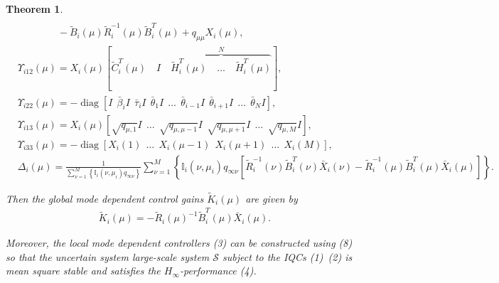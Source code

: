 \documentclass[11pt,draftcls,onecolumn]{IEEEtran}
\DeclareMathOperator{\diag}{diag}
\newtheorem{theorem}{Theorem}
\begin{document}
\begin{theorem}
\begin{align*}
\\&\quad \quad \quad \quad -\tilde{B}_i(\mu)\tilde{R}_i^{-1}(\mu)\tilde{B}_i^T(\mu)+q_{\mu \mu}X_i(\mu), \\
&\Upsilon_{i12}(\mu) = X_i(\mu)
                     \left[
                     \tilde{C}_i^{T}(\mu) \quad I \quad \overbrace{\tilde{H}_i^{T}(\mu) \quad \ldots \quad \tilde{H}_i^{T}(\mu)}^N
                     \right], \\
&\Upsilon_{i22}(\mu)= -\diag[I ~~ \bar{\beta}_i I ~~ \bar{\tau}_i I ~~ \bar{\theta}_1 I ~~ \ldots ~~ \bar{\theta}_{i-1}I~~ \bar{\theta}_{i+1}I ~~ \ldots ~~ \bar{\theta}_{N}I],\\
&\Upsilon_{i13}(\mu)=X_i(\mu)\left[\sqrt{q_{\mu,1}}I ~~  \ldots ~~ \sqrt{q_{\mu,\mu-1}}I ~~ \sqrt{q_{\mu,\mu+1}}I ~~ \ldots ~~ \sqrt{q_{\mu,M}}I \right], \\
&\Upsilon_{i33}(\mu)= -\diag[X_i(1)~~ \ldots ~~ X_i(\mu-1)~~ X_i(\mu+1)~~\ldots ~~ X_i(M) ],\\
&\Delta_i(\mu)     =\frac{1}{\sum_{\nu=1}^{M} \left\{ \mathbb{I}_{i}(\nu,\mu_{i})q_{\infty\nu}
      \right\}}\sum_{\nu=1}^{M}\left\{\mathbb{I}_i(\nu,\mu_i)q   _{\infty\nu}
\left[\tilde{R}_i^{-1}(\nu)\tilde{B}_i^T(\nu)\bar{X}_i(\nu) -\tilde{R}_i^{-1}(\mu)\tilde{B}_i^T(\mu)\bar{X}_i(\mu)
 \right] \right\}.
\end{align*}

Then the global mode dependent control gains $\tilde{K}_i(\mu)$ are given by
\begin{align}
\tilde{K}_i(\mu)=-\tilde{R}_i(\mu)^{-1}\tilde{B}_i^T(\mu)\bar{X}_i(\mu).
\end{align}

Moreover,  the local mode dependent controllers (3) can be constructed using (8) so that the uncertain system large-scale system $\mathcal{S}$ subject to the IQCs (1)~(2) is mean square stable and satisfies the $H_\infty$-performance (4).
\end{theorem}
\end{document}

